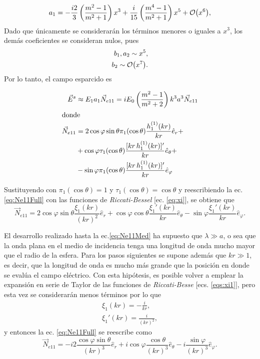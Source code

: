 \documentclass[letterpaper, 12pt] {article}
\begin{document}
\begin{equation}
a_1 = -\frac{i2}{3}\left(\frac{m^2-1}{m^2+1}\right)x^3 + \frac{i}{15}  \left(\frac{m^4-1}{m^2+1}\right) x^5 + \order{x^6}, 
\end{equation}
Dado que únicamente se considerarán los términos menores o iguales a $x^3$, los demás coeficientes se consideran nulos, pues
 \begin{align*}
 b_1, a_2 \sim x^5,\\
 b_2 \sim \order{x^7}.
 \end{align*}
Por lo tanto, el campo esparcido es

\begin{align}
\vec{E}^s &\approx E_1 a_1 \vec{N}_{e11} = iE_0\left(\frac{m^2-1}{m^2+2} \right) k^3 a^3 \vec{N}_{e11} \label{eq:EsApprox}\\
\intertext{donde}				
\vec{N}_{e11} &= 2 \cos\varphi \sin\theta \pi_1(\cos\theta) \frac{h_1^{(1)}(kr)}{kr}\hat{e}_r + \notag\\
&+ \cos\varphi\tau_1(\cos\theta) \frac{[kr\, h_1^{(1)}(kr)]'}{kr} \hat{e}_\theta +\notag\\
&-  \sin\varphi\pi_1(\cos\theta) \frac{[kr \, h_1^{(1)}(kr)]'}{kr} \hat{e}_\varphi \label{eq:Ne11Full}
\end{align}

Sustituyendo con $\pi_1(\cos\theta) = 1$ y $\tau_1(\cos\theta) = \cos\theta$ y reescribiendo la ec. \eqref{eq:Ne11Full} con las funciones de \emph{Riccati-Bessel} [ec. \eqref{eq:xi}], se obtiene que
\begin{equation}
\vec{N}_{e11} = 2 \cos\varphi \sin\theta \frac{\xi_1(kr)}{(kr)^2}\hat{e}_r 
+ \cos\varphi \cos\theta \frac{\xi_1'(kr)}{kr} \hat{e}_\theta -  \sin\varphi  \frac{\xi_1'(kr)}{kr} \hat{e}_\varphi. \label{eq:Ne11Med}
\end{equation}

El desarrollo realizado hasta la ec.\eqref{eq:Ne11Med} ha supuesto que $\lambda\gg a$, o sea que la onda plana en el medio de incidencia tenga una longitud de onda mucho mayor que el radio de la esfera. Para los pasos siguientes se supone además que $kr\gg 1$, es decir, que la longitud de onda es mucho más grande que la posición en donde se evalúa el campo eléctrico. Con esta hipótesis, es posible volver a emplear la expansión en serie de Taylor de las funciones de \emph{Riccati-Besse} [ecs. \eqref{eqs:xi1}], pero esta vez se considerarán menos términos por lo que
 \begin{align}
 \xi_1(kr) = -\frac{i}{kr},\\
 \xi_1' (kr) = \frac{i}{(kr)^2},
 \end{align}
y entonces la ec. \eqref{eq:Ne11Full} se reescribe como
\begin{equation}
\vec{N}_{e11} = -i2 \frac{\cos\varphi \sin\theta }{(kr)^3}\hat{e}_r 
+ i \cos\varphi \frac{\cos\theta }{(kr)^3} \hat{e}_\theta - i  \frac{\sin\varphi }{(kr)^3} \hat{e}_\varphi . \label{eq:Ne11}
\end{equation}
\end{document}
